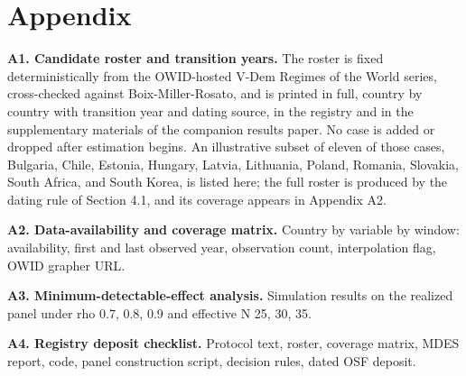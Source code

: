 \section*{Appendix}

\textbf{A1. Candidate roster and transition years.} The roster is fixed deterministically from the OWID-hosted V-Dem Regimes of the World series, cross-checked against Boix-Miller-Rosato, and is printed in full, country by country with transition year and dating source, in the registry and in the supplementary materials of the companion results paper. No case is added or dropped after estimation begins. An illustrative subset of eleven of those cases, Bulgaria, Chile, Estonia, Hungary, Latvia, Lithuania, Poland, Romania, Slovakia, South Africa, and South Korea, is listed here; the full roster is produced by the dating rule of Section 4.1, and its coverage appears in Appendix A2.

\textbf{A2. Data-availability and coverage matrix.} Country by variable by window: availability, first and last observed year, observation count, interpolation flag, OWID grapher URL.

\textbf{A3. Minimum-detectable-effect analysis.} Simulation results on the realized panel under rho 0.7, 0.8, 0.9 and effective N 25, 30, 35.

\textbf{A4. Registry deposit checklist.} Protocol text, roster, coverage matrix, MDES report, code, panel construction script, decision rules, dated OSF deposit.